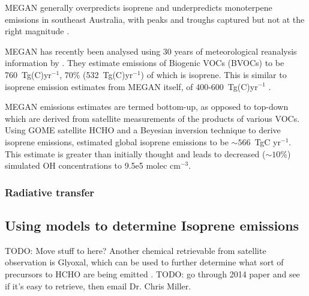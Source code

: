       MEGAN generally overpredicts isoprene and underpredicts monoterpene emissions in southeast Australia, with peaks and troughs captured but not at the right magnitude \citep{Emmerson2016}.
      
      MEGAN has recently been analysed using 30 years of meteorological reanalysis information by \citet{Sindelarova2014}.
      They estimate emissions of Biogenic VOCs (BVOCs) to be 760~Tg(C)yr$^{-1}$, 70\% (532~Tg(C)yr$^{-1}$) of which is isoprene.
      This is similar to isoprene emission estimates from MEGAN itself, of 400-600~Tg(C)yr$^{-1}$ \citep{Guenther2006}.
      
      MEGAN emissions estimates are termed bottom-up, as opposed to top-down which are derived from satellite measurements of the products of various VOCs.
      Using GOME satellite HCHO and a Beyesian inversion technique to derive isoprene emissions, \citet{Shim2005} estimated global isoprene emissions to be $\sim566$~TgC yr$^{-1}$. 
      This estimate is greater than initially thought and leads to decreased ($\sim10\%$) simulated OH concentrations to 9.5e5 molec cm$^{-3}$.

    \subsubsection{Radiative transfer} %
    
  \subsection{Using models to determine Isoprene emissions}
    TODO: Move stuff to here?
    Another chemical retrievable from satellite observation is Glyoxal, which can be used to further determine what sort of precursors to HCHO are being emitted \citep{Miller2014, Miller2017}.
    TODO: go through 2014 paper and see if it's easy to retrieve, then email Dr. Chris Miller.
  
